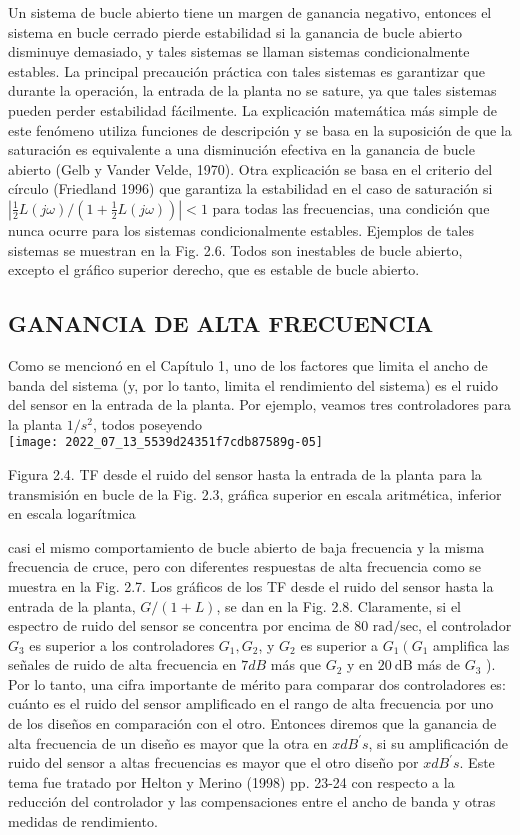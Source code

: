 Un sistema de bucle abierto tiene un margen de ganancia negativo, entonces el sistema en bucle cerrado pierde estabilidad si la ganancia de bucle abierto disminuye demasiado, y tales sistemas se llaman sistemas condicionalmente estables. La principal precaución práctica con tales sistemas es garantizar que durante la operación, la entrada de la planta no se sature, ya que tales sistemas pueden perder estabilidad fácilmente. La explicación matemática más simple de este fenómeno utiliza funciones de descripción y se basa en la suposición de que la saturación es equivalente a una disminución efectiva en la ganancia de bucle abierto (Gelb y Vander Velde, 1970). Otra explicación se basa en el criterio del círculo (Friedland 1996) que garantiza la estabilidad en el caso de saturación si $\left|\frac{1}{2} L(j \omega) /\left(1+\frac{1}{2} L(j \omega)\right)\right|<1$ para todas las frecuencias, una condición que nunca ocurre para los sistemas condicionalmente estables. Ejemplos de tales sistemas se muestran en la Fig. 2.6. Todos son inestables de bucle abierto, excepto el gráfico superior derecho, que es estable de bucle abierto.

\subsection{GANANCIA DE ALTA FRECUENCIA}
Como se mencionó en el Capítulo 1, uno de los factores que limita el ancho de banda del sistema (y, por lo tanto, limita el rendimiento del sistema) es el ruido del sensor en la entrada de la planta. Por ejemplo, veamos tres controladores para la planta $1 / s^{2}$, todos poseyendo\\

\texttt{[image: 2022\_07\_13\_5539d24351f7cdb87589g-05]}

Figura 2.4. TF desde el ruido del sensor hasta la entrada de la planta para la transmisión en bucle de la Fig. 2.3, gráfica superior en escala aritmética, inferior en escala logarítmica

casi el mismo comportamiento de bucle abierto de baja frecuencia y la misma frecuencia de cruce, pero con diferentes respuestas de alta frecuencia como se muestra en la Fig. 2.7. Los gráficos de los TF desde el ruido del sensor hasta la entrada de la planta, $G /(1+L)$, se dan en la Fig. 2.8. Claramente, si el espectro de ruido del sensor se concentra por encima de 80 $\mathrm{rad} / \mathrm{sec}$, el controlador $G_{3}$ es superior a los controladores $G_{1}, G_{2}$, y $G_{2}$ es superior a $G_{1}\left(G_{1}\right.$ amplifica las señales de ruido de alta frecuencia en $7 d B$ más que $G_{2}$ y en $20 \mathrm{~dB}$ más de $G_{3}$ ). Por lo tanto, una cifra importante de mérito para comparar dos controladores es: cuánto es el ruido del sensor amplificado en el rango de alta frecuencia por uno de los diseños en comparación con el otro. Entonces diremos que la ganancia de alta frecuencia de un diseño es mayor que la otra en $x d B^{\prime} s$, si su amplificación de ruido del sensor a altas frecuencias es mayor que el otro diseño por $x d B^{\prime} s$. Este tema fue tratado por Helton y Merino (1998) pp. 23-24 con respecto a la reducción del controlador y las compensaciones entre el ancho de banda y otras medidas de rendimiento.


